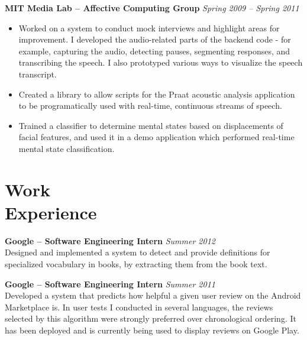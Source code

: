 \documentclass[margin,line]{resume}
\begin{document}
\begin{resume}

\textbf{MIT Media Lab -- Affective Computing Group} \hfill \textsl{Spring 2009 -- Spring 2011}
\begin{itemize}
\item Worked on a system to conduct mock interviews and highlight areas for improvement. I developed the audio-related parts of the backend code - for example, capturing the audio, detecting pauses, segmenting responses, and transcribing the speech. I also prototyped various ways to visualize the speech transcript.
\item Created a library to allow scripts for the Praat acoustic analysis application to be programatically used with real-time, continuous streams of speech.
\item Trained a classifier to determine mental states based on displacements of facial features, and used it in a demo application which performed real-time mental state classification.
\end{itemize}


\section{\mysidestyle Work\\Experience}

\textbf{Google -- Software Engineering Intern} \hfill \textsl{Summer 2012}\\
Designed and implemented a system to detect and provide definitions for specialized vocabulary in books, by extracting them from the book text.

\textbf{Google -- Software Engineering Intern} \hfill \textsl{Summer 2011}\\
Developed a system that predicts how helpful a given user review on the Android Marketplace is.
In user tests I conducted in several languages, the reviews selected by this algorithm
were strongly preferred over chronological ordering. It has been deployed and is currently being used to display reviews on Google Play.


\end{resume}
\end{document}
